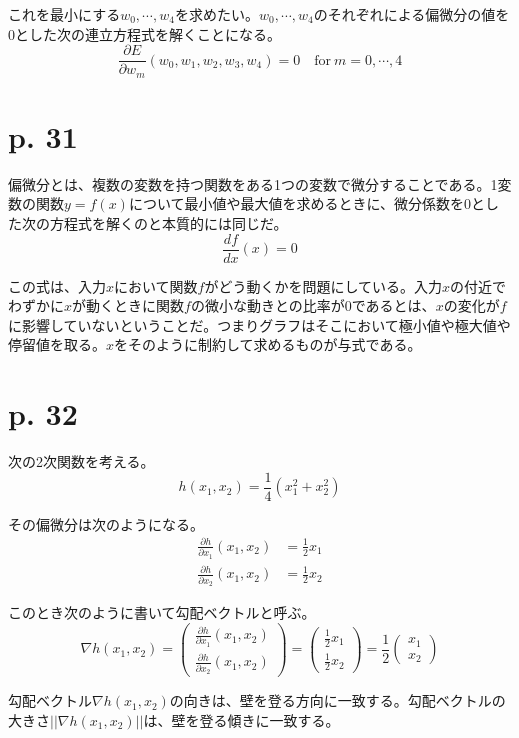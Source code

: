 \documentclass[uplatex,dvipdfmx]{jsarticle} \usepackage{amsmath,amssymb,bm}
\begin{document}
これを最小にする$w_0, \cdots, w_4$を求めたい。$w_0, \cdots, w_4$のそれぞれによる偏微分の値を0とした次の連立方程式を解くことになる。
$$\frac{\partial E}{\partial w_m}(w_0,w_1,w_2,w_3,w_4) = 0 \quad\text{for}\ m=0,\cdots,4$$



\section*{p. 31}
偏微分とは、複数の変数を持つ関数をある1つの変数で微分することである。1変数の関数$y=f(x)$について最小値や最大値を求めるときに、微分係数を0とした次の方程式を解くのと本質的には同じだ。
$$\frac{df}{dx}(x)=0$$

この式は、入力$x$において関数$f$がどう動くかを問題にしている。入力$x$の付近でわずかに$x$が動くときに関数$f$の微小な動きとの比率が0であるとは、$x$の変化が$f$に影響していないということだ。つまりグラフはそこにおいて極小値や極大値や停留値を取る。$x$をそのように制約して求めるものが与式である。



\section*{p. 32}
次の2次関数を考える。
$$h(x_1,x_2)=\frac14(x_1^2+x_2^2)$$

その偏微分は次のようになる。
\begin{align*}
\frac{\partial h}{\partial x_1}(x_1,x_2) &= \frac12x_1 \\
\frac{\partial h}{\partial x_2}(x_1,x_2) &= \frac12x_2
\end{align*}

このとき次のように書いて勾配ベクトルと呼ぶ。
$$\nabla h(x_1,x_2) =
\begin{pmatrix}
\frac{\partial h}{\partial x_1}(x_1,x_2) \\[2mm]
\frac{\partial h}{\partial x_2}(x_1,x_2)
\end{pmatrix}
=
\begin{pmatrix}
\frac12x_1 \\[2mm]
\frac12x_2
\end{pmatrix}
=\frac12
\begin{pmatrix}
x_1\\x_2
\end{pmatrix}
$$

勾配ベクトル$\nabla h(x_1, x_2)$の向きは、壁を登る方向に一致する。勾配ベクトルの大きさ$||\nabla h(x_1,x_2)||$は、壁を登る傾きに一致する。
\end{document}
